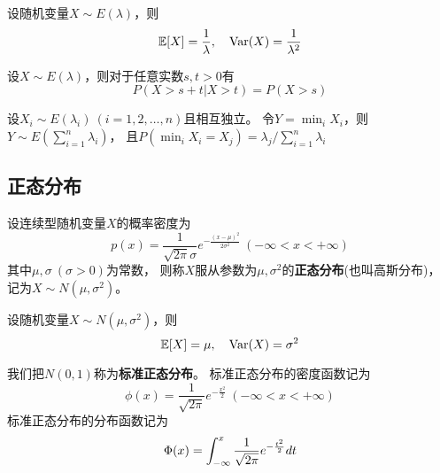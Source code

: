 \begin{theorem}[指数分布的数字特征]
  设随机变量$X\sim E(\lambda)$，则
  \begin{displaymath}
    \mathbb{E}[X] = \frac{1}{\lambda},\quad \textrm{Var}(X) = \frac{1}{\lambda^2}
  \end{displaymath}
\end{theorem}

\begin{theorem}[指数分布的无记忆性]
  设$X\sim E(\lambda)$，则对于任意实数$s,t>0$有
  \begin{displaymath}
    P(X>s+t|X>t) = P(X>s)
  \end{displaymath}
\end{theorem}

\begin{theorem}[多个独立指数分布的极小分布]
  设$X_i\sim E(\lambda_i)\ (i=1,2,\dots,n)$且相互独立。
  令$Y=\min_i X_i$，则$Y\sim E(\sum_{i=1}^{n}\lambda_i)$，
  且$P(\min_i X_i = X_j)= \lambda_j/\sum_{i=1}^{n}\lambda_i$
\end{theorem}

\subsection{正态分布}
\begin{definition}
  设连续型随机变量$X$的概率密度为
  \begin{displaymath}
    p(x)=\frac{1}{\sqrt{2\pi}\sigma} e^{-\frac{(x-\mu)^2}{2\sigma^2}}
    \ (-\infty < x < +\infty)
  \end{displaymath}
  其中$\mu,\sigma\ (\sigma > 0)$为常数，
  则称$X$服从参数为$\mu,\sigma^2$的\textbf{正态分布}(也叫高斯分布)，
  记为$X\sim N(\mu,\sigma^2)$。
\end{definition}

\begin{theorem}[正态分布的数字特征]
  设随机变量$X\sim N(\mu,\sigma^2)$，则
  \begin{displaymath}
    \mathbb{E}[X] = \mu,\quad \textrm{Var}(X) = \sigma^2
  \end{displaymath}
\end{theorem}

\begin{definition}[标准正态分布]
  我们把$N(0,1)$称为\textbf{标准正态分布}。
  标准正态分布的密度函数记为
  \begin{displaymath}
    \phi(x) = \frac{1}{\sqrt{2\pi}} e^{-\frac{x^2}{2}}
    \ (-\infty < x < +\infty)
  \end{displaymath}
  标准正态分布的分布函数记为
  \begin{displaymath}
    \Phi(x) = \int_{-\infty}^{x}\frac{1}{\sqrt{2\pi}} e^{-\frac{t^2}{2}} dt
  \end{displaymath}
\end{definition}

